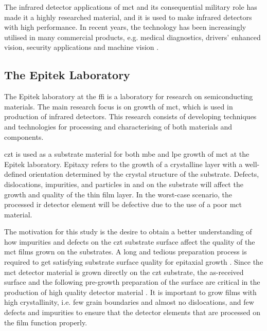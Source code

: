 The infrared detector applications of \ac{mct} and its consequential military role has made it a highly researched material, and it is used to make infrared detectors with high performance. In recent years, the technology has been increasingly utilised in many commercial products, e.g. medical diagnostics, drivers' enhanced vision, security applications and machine vision \citep{dhar2013advances}.

\subsection{The Epitek Laboratory}

The Epitek laboratory at the \ac{ffi} is a laboratory for research on semiconducting materials. The main research focus is on growth of \ac{mct}, which is used in production of infrared detectors. This research consists of developing techniques and technologies for processing and characterising of both materials and components.

\Ac{czt} is used as a substrate material for both \ac{mbe} and \ac{lpe} growth of \ac{mct} at the Epitek laboratory. Epitaxy refers to the growth of a crystalline layer with a well-defined orientation determined by the crystal structure of the substrate. Defects, dislocations, impurities, and particles in and on the substrate will affect the growth and quality of the thin film layer. In the worst-case scenario, the processed \ac{ir} detector element will be defective due to the use of a poor \ac{mct} material. %

The motivation for this study is the desire to obtain a better understanding of how impurities and defects on the \ac{czt} substrate surface affect the quality of the \ac{mct} films grown on the substrates. A long and tedious preparation process is required to get satisfying substrate surface quality for epitaxial growth \citep{triboulet2009cdteI}. Since the \ac{mct} detector material is grown directly on the \ac{czt} substrate, the as-received surface and the following pre-growth preparation of the surface are critical in the production of high quality detector material \citep{benson2015as-received}. It is important to grow films with high crystallinity, i.e. few grain boundaries and almost no dislocations, and few defects and impurities to ensure that the detector elements that are processed on the film function properly.


